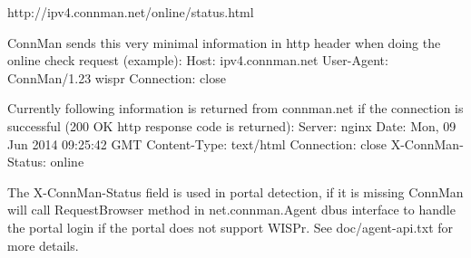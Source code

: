
http://ipv4.connman.net/online/status.html

ConnMan sends this very minimal information in http header when doing
the online check request (example):
	Host: ipv4.connman.net
	User-Agent: ConnMan/1.23 wispr
	Connection: close

Currently following information is returned from connman.net if
the connection is successful (200 OK http response code is returned):
	Server: nginx
	Date: Mon, 09 Jun 2014 09:25:42 GMT
	Content-Type: text/html
	Connection: close
	X-ConnMan-Status: online

The X-ConnMan-Status field is used in portal detection, if it is missing
ConnMan will call RequestBrowser method in net.connman.Agent dbus
interface to handle the portal login if the portal does not support WISPr.
See doc/agent-api.txt for more details.

\bye
